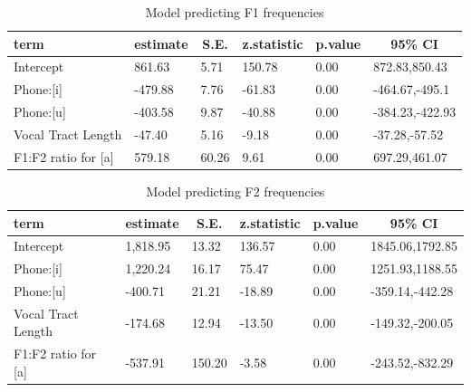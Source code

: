 \documentclass[
]{article}
\begin{document}
\begin{table}[tbp]

\begin{center}
\begin{threeparttable}

\caption{\label{tab:f1-model}Model predicting F1 frequencies}

\begin{tabular}{llllll}
\toprule
term & \multicolumn{1}{c}{estimate} & \multicolumn{1}{c}{S.E.} & \multicolumn{1}{c}{z.statistic} & \multicolumn{1}{c}{p.value} & \multicolumn{1}{c}{95\% CI}\\
\midrule
Intercept & 861.63 & 5.71 & 150.78 & 0.00 & 872.83,850.43\\
Phone:[i] & -479.88 & 7.76 & -61.83 & 0.00 & -464.67,-495.1\\
Phone:[u] & -403.58 & 9.87 & -40.88 & 0.00 & -384.23,-422.93\\
Vocal Tract Length & -47.40 & 5.16 & -9.18 & 0.00 & -37.28,-57.52\\
F1:F2 ratio for [a] & 579.18 & 60.26 & 9.61 & 0.00 & 697.29,461.07\\
\bottomrule
\end{tabular}

\end{threeparttable}
\end{center}

\end{table}

\begin{table}[tbp]

\begin{center}
\begin{threeparttable}

\caption{\label{tab:f2-model}Model predicting F2 frequencies}

\begin{tabular}{llllll}
\toprule
term & \multicolumn{1}{c}{estimate} & \multicolumn{1}{c}{S.E.} & \multicolumn{1}{c}{z.statistic} & \multicolumn{1}{c}{p.value} & \multicolumn{1}{c}{95\% CI}\\
\midrule
Intercept & 1,818.95 & 13.32 & 136.57 & 0.00 & 1845.06,1792.85\\
Phone:[i] & 1,220.24 & 16.17 & 75.47 & 0.00 & 1251.93,1188.55\\
Phone:[u] & -400.71 & 21.21 & -18.89 & 0.00 & -359.14,-442.28\\
Vocal Tract Length & -174.68 & 12.94 & -13.50 & 0.00 & -149.32,-200.05\\
F1:F2 ratio for [a] & -537.91 & 150.20 & -3.58 & 0.00 & -243.52,-832.29\\
\bottomrule
\end{tabular}

\end{threeparttable}
\end{center}

\end{table}
\end{document}
